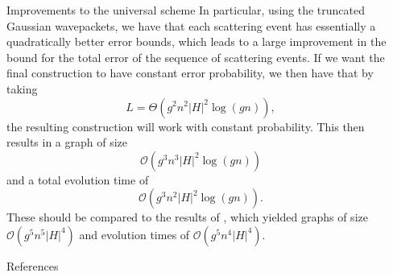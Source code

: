 \documentclass{beamer}
\newlength{\sepwid}
\newlength{\onecolwid}
\newcommand{\OO}{\mathcal{O}}
\begin{document}
\begin{frame}[t]
\begin{columns}[t]
\begin{column}{\onecolwid}
\begin{block}{Improvements to the universal scheme}
	  In particular, using the truncated Gaussian wavepackets, we have that each scattering event has essentially a quadratically better error bounds, which leads to a large improvement in the bound for the total error of the sequence of scattering events.  If we want the final construction to have constant error probability, we then have that by taking 
	  \[
	    L = \Theta \left( g^2 n^2 |H|^2 \log(gn)\right),
	  \]
	  the resulting construction will work with constant probability.  This then results in a graph of size
	  \[
	    \OO \left(g^3 n^3 |H|^2 \log(gn) \right)
	  \]
	  and a total evolution time of
	  \[
	    \OO \left( g^3 n^2 |H|^2 \log(gn)\right).
	  \]
	  These should be compared to the results of \cite{MPQW}, which yielded graphs of size $\OO(g^5n^5|H|^4)$ and evolution times of $\OO(g^5n^4|H|^4)$.
    
    
    \end{block}
  
  \begin{block}{References}
  \nocite{*}
  
  \footnotesize{}
  \end{block}


\end{column}


\begin{column}{\sepwid}\end{column}

\end{columns}
\end{frame}
\end{document}
